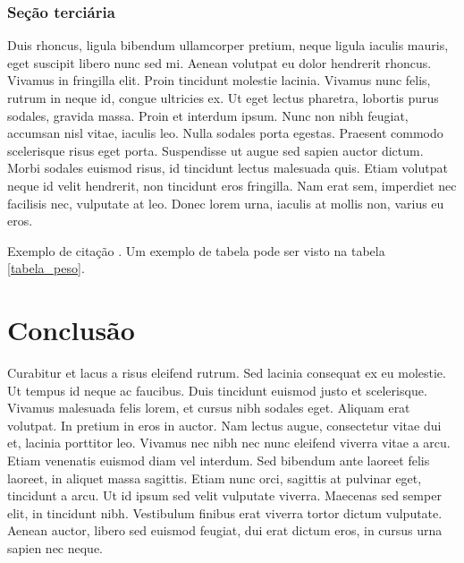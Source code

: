 \documentclass[
	12pt,				%
	openright,			%
	oneside,			%
	a4paper,			%
	chapter=TITLE,		%
	english,			%
	brazil,				%
	]{abntex2}
\begin{document}
\subsection{Seção terciária}

Duis rhoncus, ligula bibendum ullamcorper pretium, neque ligula iaculis mauris, eget suscipit libero nunc sed mi. Aenean volutpat eu dolor hendrerit rhoncus. Vivamus in fringilla elit. Proin tincidunt molestie lacinia. Vivamus nunc felis, rutrum in neque id, congue ultricies ex. Ut eget lectus pharetra, lobortis purus sodales, gravida massa. Proin et interdum ipsum. Nunc non nibh feugiat, accumsan nisl vitae, iaculis leo. Nulla sodales porta egestas. Praesent commodo scelerisque risus eget porta. Suspendisse ut augue sed sapien auctor dictum. Morbi sodales euismod risus, id tincidunt lectus malesuada quis. Etiam volutpat neque id velit hendrerit, non tincidunt eros fringilla. Nam erat sem, imperdiet nec facilisis nec, vulputate at leo. Donec lorem urna, iaculis at mollis non, varius eu eros.

Exemplo de citação \cite{neumann}. Um exemplo de tabela pode ser visto na tabela \ref{tabela_peso}.

\begin{table}[htb]
\end{table}
\FloatBarrier


\chapter{Conclusão}

Curabitur et lacus a risus eleifend rutrum. Sed lacinia consequat ex eu molestie. Ut tempus id neque ac faucibus. Duis tincidunt euismod justo et scelerisque. Vivamus malesuada felis lorem, et cursus nibh sodales eget. Aliquam erat volutpat. In pretium in eros in auctor. Nam lectus augue, consectetur vitae dui et, lacinia porttitor leo. Vivamus nec nibh nec nunc eleifend viverra vitae a arcu. Etiam venenatis euismod diam vel interdum. Sed bibendum ante laoreet felis laoreet, in aliquet massa sagittis. Etiam nunc orci, sagittis at pulvinar eget, tincidunt a arcu. Ut id ipsum sed velit vulputate viverra. Maecenas sed semper elit, in tincidunt nibh. Vestibulum finibus erat viverra tortor dictum vulputate. Aenean auctor, libero sed euismod feugiat, dui erat dictum eros, in cursus urna sapien nec neque.
\end{document}
